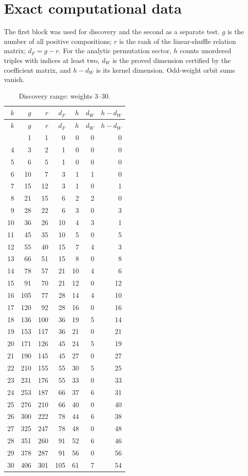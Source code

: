 \documentclass[12pt]{amsart}
\theoremstyle{definition}
\theoremstyle{remark}
\numberwithin{equation}{section}
\numberwithin{equation}{section}
\begin{document}
\appendix
\renewcommand{\thesection}{E.\Alph{section}}
\renewcommand{\theHsection}{E.\Alph{section}}
\section{Exact computational data}
The first block was used for discovery and the second as a separate test.
$g$ is the number of all positive compositions; $r$ is the rank of the
linear-shuffle relation matrix; $d_F=g-r$. For the analytic permutation
sector, $h$ counts unordered triples with indices at least two, $d_W$ is the
proved dimension certified by the coefficient matrix, and $h-d_W$ is its
kernel dimension. Odd-weight orbit sums vanish.
\begingroup\small
\begin{longtable}{rrrrrrr}
\caption{Discovery range: weights 3--30.}\\
\toprule $k$ & $g$ & $r$ & $d_F$ & $h$ & $d_W$ & $h-d_W$\\\midrule\endfirsthead
\toprule $k$ & $g$ & $r$ & $d_F$ & $h$ & $d_W$ & $h-d_W$\\\midrule\endhead
\bottomrule\endfoot
3 & 1 & 1 & 0 & 0 & 0 & 0\\
4 & 3 & 2 & 1 & 0 & 0 & 0\\
5 & 6 & 5 & 1 & 0 & 0 & 0\\
6 & 10 & 7 & 3 & 1 & 1 & 0\\
7 & 15 & 12 & 3 & 1 & 0 & 1\\
8 & 21 & 15 & 6 & 2 & 2 & 0\\
9 & 28 & 22 & 6 & 3 & 0 & 3\\
10 & 36 & 26 & 10 & 4 & 3 & 1\\
11 & 45 & 35 & 10 & 5 & 0 & 5\\
12 & 55 & 40 & 15 & 7 & 4 & 3\\
13 & 66 & 51 & 15 & 8 & 0 & 8\\
14 & 78 & 57 & 21 & 10 & 4 & 6\\
15 & 91 & 70 & 21 & 12 & 0 & 12\\
16 & 105 & 77 & 28 & 14 & 4 & 10\\
17 & 120 & 92 & 28 & 16 & 0 & 16\\
18 & 136 & 100 & 36 & 19 & 5 & 14\\
19 & 153 & 117 & 36 & 21 & 0 & 21\\
20 & 171 & 126 & 45 & 24 & 5 & 19\\
21 & 190 & 145 & 45 & 27 & 0 & 27\\
22 & 210 & 155 & 55 & 30 & 5 & 25\\
23 & 231 & 176 & 55 & 33 & 0 & 33\\
24 & 253 & 187 & 66 & 37 & 6 & 31\\
25 & 276 & 210 & 66 & 40 & 0 & 40\\
26 & 300 & 222 & 78 & 44 & 6 & 38\\
27 & 325 & 247 & 78 & 48 & 0 & 48\\
28 & 351 & 260 & 91 & 52 & 6 & 46\\
29 & 378 & 287 & 91 & 56 & 0 & 56\\
30 & 406 & 301 & 105 & 61 & 7 & 54\\
\end{longtable}
\end{document}
